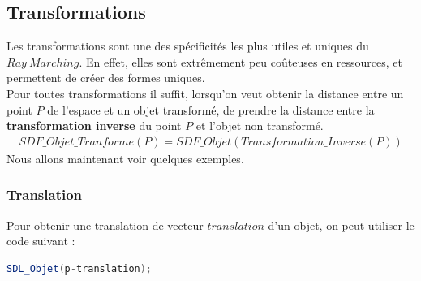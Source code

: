 \newpage
\subsection{Transformations}\label{subsec:Transformations}
Les transformations sont une des spécificités les plus utiles et uniques du $Ray\ Marching$. En effet, elles sont extrêmement peu coûteuses en ressources, et permettent de créer des formes uniques.
\\Pour toutes transformations il suffit, lorsqu'on veut obtenir la distance entre un point $P$ de l'espace et un objet transformé, de prendre la distance entre la \textbf{transformation inverse} du point $P$ et l'objet non transformé.
\begin{align*}
    SDF\_Objet\_Tranforme(P)=SDF\_Objet(Transformation\_Inverse(P))
\end{align*}
Nous allons maintenant voir quelques exemples.

\subsubsection{Translation}
Pour obtenir une translation de vecteur $translation$ d'un objet, on peut utiliser le code suivant :
\begin{lstlisting}[language=GLSL]
SDL_Objet(p-translation);
\end{lstlisting}


